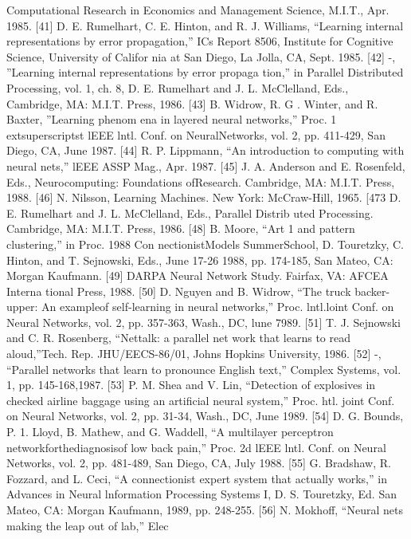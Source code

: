 \documentclass[11pt,a4paper,twocolumn]{article}
\begin{document}
{{Computational Research in Economics and Management 
Science, M.I.T., Apr. 1985. 
[41] D. E. Rumelhart, C. E. Hinton, and R. J. Williams, “Learning 
internal representations by error propagation,” ICs Report 
8506, Institute for Cognitive Science, University of Califor
nia at San Diego, La Jolla, CA, Sept. 1985. 
[42] -, 
”Learning internal representations by error propaga
tion,” in Parallel Distributed Processing, vol. 1, ch. 8, D. E. 
Rumelhart and J. L. McClelland, Eds., Cambridge, MA: M.I.T. 
Press, 1986. 
[43] B. Widrow, R. G .  Winter, and R. Baxter, ”Learning phenom
ena in layered neural networks,” Proc. 1	extsuperscript{st} lEEE lntl. Conf. 
on NeuralNetworks, vol. 2, pp. 411-429, San Diego, CA, June 
1987. 
[44] R. P. Lippmann, “An introduction to computing with neural 
nets,” lEEE ASSP Mag., Apr. 1987. 
[45] J. A. Anderson and E. Rosenfeld, Eds., Neurocomputing: 
Foundations ofResearch. Cambridge, MA: M.I.T. Press, 1988. 
[46] N. Nilsson, Learning Machines. New York: McCraw-Hill, 
1965. 
[473 D. E. Rumelhart and J. L. McClelland, Eds., Parallel Distrib
uted Processing. Cambridge, MA: M.I.T. Press, 1986. 
[48] B. Moore, “Art 1 and pattern clustering,” in Proc. 1988 Con
nectionistModels SummerSchool, D. Touretzky, C. Hinton, 
and T. Sejnowski, Eds., June 17-26 1988, pp. 174-185, San 
Mateo, CA: Morgan Kaufmann. 
[49] DARPA Neural Network Study. Fairfax, VA: AFCEA Interna
tional Press, 1988. 
[50] D. Nguyen and B. Widrow, “The truck backer-upper: An 
exampleof self-learning in neural networks,” Proc. lntl.loint 
Conf. on Neural Networks, vol. 2, pp. 357-363, Wash., DC, 
lune 7989. 
[51] T. J. Sejnowski and C. R. Rosenberg, “Nettalk: a parallel net
work that learns to read aloud,”Tech. Rep. JHU/EECS-86/01, 
Johns Hopkins University, 1986. 
[52] -, 
“Parallel networks that learn to pronounce English 
text,” Complex Systems, vol. 1, pp. 145-168,1987. 
[53] P. M. Shea and V. Lin, “Detection of explosives in checked 
airline baggage using an artificial neural system,” Proc. htl. 
joint Conf. on Neural Networks, vol. 2, pp. 31-34, Wash., 
DC, June 1989. 
[54] D. G. Bounds, P. 1. Lloyd, B. Mathew, and G. Waddell, “A 
multilayer perceptron networkforthediagnosisof low back 
pain,” Proc. 2d lEEE lntl. Conf. on Neural Networks, vol. 2, 
pp. 481-489, San Diego, CA, July 1988. 
[55] G. Bradshaw, R. Fozzard, and L. Ceci, “A connectionist 
expert system that actually works,” in Advances in Neural 
lnformation Processing Systems I, D. S. Touretzky, Ed. San 
Mateo, CA: Morgan Kaufmann, 1989, pp. 248-255. 
[56] N. Mokhoff, “Neural nets making the leap out of lab,” Elec
}}
\end{document}
